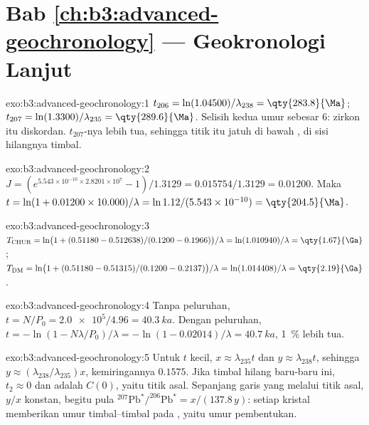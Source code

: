 \section*{Bab \ref{ch:b3:advanced-geochronology} --- Geokronologi Lanjut}

\begin{solution}{exo:b3:advanced-geochronology:1}
$t_{206} = \ln(1.04500)/\lambda_{238} = \qty{283.8}{\Ma}$; $t_{207} =
\ln(1.3300)/\lambda_{235} = \qty{289.6}{\Ma}$. Selisih kedua umur sebesar
\qty{6}{\Ma}: zirkon itu diskordan. $t_{207}$-nya lebih tua, sehingga titik itu jatuh
di bawah , di sisi hilangnya timbal.
\end{solution}

\begin{solution}{exo:b3:advanced-geochronology:2}
$J = (e^{5.543\times10^{-10}\times2.8201\times10^7} - 1)/1.3129 =
0.015754/1.3129 = 0.01200$. Maka $t = \ln(1 + 0.01200\times10.000)/\lambda =
\ln 1.12/(5.543\times10^{-10}) = \qty{204.5}{\Ma}$.
\end{solution}

\begin{solution}{exo:b3:advanced-geochronology:3}
$T_{\mathrm{CHUR}} = \ln\bigl(1 + (0.51180 - 0.512638)/(0.1200 -
0.1966)\bigr)/\lambda = \ln(1.010940)/\lambda = \qty{1.67}{\Ga}$;
$T_{\mathrm{DM}} = \ln\bigl(1 + (0.51180 - 0.51315)/(0.1200 - 0.2137)\bigr)/\lambda
= \ln(1.014408)/\lambda = \qty{2.19}{\Ga}$.
\end{solution}

\begin{solution}{exo:b3:advanced-geochronology:4}
Tanpa peluruhan, $t = N/P_0 = \num{2.0e5}/4.96 = \qty{40.3}{ka}$. Dengan peluruhan,
$t = -\ln(1 - N\lambda/P_0)/\lambda = -\ln(1 - 0.02014)/\lambda =
\qty{40.7}{ka}$, \qty{1}{\percent} lebih tua.
\end{solution}

\begin{solution}{exo:b3:advanced-geochronology:5}
Untuk $t$ kecil, $x \approx \lambda_{235}t$ dan $y \approx \lambda_{238}t$, sehingga
$y \approx (\lambda_{238}/\lambda_{235})x$, kemiringannya $0.1575$. Jika timbal
hilang baru-baru ini, $t_2 \approx 0$ dan  adalah $C(0)$, yaitu
titik asal. Sepanjang garis yang melalui titik asal, $y/x$ konstan, begitu pula
$^{207}\mathrm{Pb}^*/^{206}\mathrm{Pb}^* = x/(137.8\,y)$: setiap kristal memberikan
umur timbal--timbal pada , yaitu umur pembentukan.
\end{solution}


